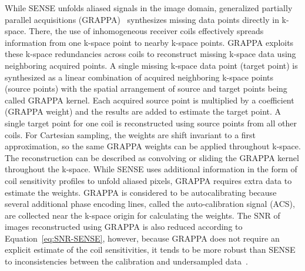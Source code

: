 While SENSE unfolds aliased signals in the image domain, generalized partially parallel acquisitions (GRAPPA)~\cite{GRAPPA} synthesizes missing data points directly in k-space. 
There, the use of inhomogeneous receiver coils effectively spreads information from one k-space point to nearby k-space points. GRAPPA exploits these k-space redundancies across coils to reconstruct missing k-space data using neighboring acquired points. A single missing k-space data point (target point) is synthesized as a linear combination of acquired neighboring k-space points (source points) with the spatial arrangement of source and target points being called GRAPPA kernel. Each acquired source point is multiplied by a coefficient (GRAPPA weight) and the results are added to estimate the target point. A single target point for one coil is reconstructed using source points from all other coils. For Cartesian sampling, the weights are shift invariant to a first approximation, so the same GRAPPA weights can be applied throughout k-space. The reconstruction can be described as convolving or sliding the GRAPPA kernel throughout the k-space.
While SENSE uses additional information in the form of coil sensitivity profiles to unfold aliased pixels, GRAPPA requires extra data to estimate the weights. GRAPPA is considered to be autocalibrating because several additional phase encoding lines, called the auto-calibration signal (ACS), are collected near the k-space origin for calculating the weights. 
The SNR of images reconstructed using GRAPPA is also reduced according to Equation~\ref{eq:SNR-SENSE}, however, because GRAPPA does not require an explicit estimate of the coil sensitivities, it tends to be more robust than SENSE to inconsistencies between the calibration and undersampled data~\cite{AdvancesPI}.\\
